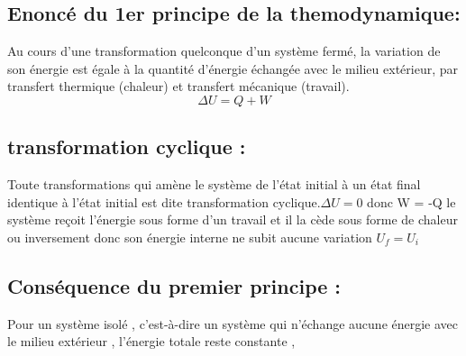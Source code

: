 \documentclass[12pt]{article}
\begin{document}
\subsection{Enoncé du 1er principe de la themodynamique:}
Au cours d'une transformation quelconque d'un système fermé, la variation de son énergie est égale à la quantité d'énergie échangée avec le milieu extérieur, par transfert thermique (chaleur) et transfert mécanique (travail).
$$\Delta{U}=Q + W $$

\subsection{transformation cyclique :}
Toute transformations qui amène le système de l’état initial à un état final identique à l’état initial est dite transformation
cyclique.$\Delta{U}= 0$
donc W = -Q le système reçoit l’énergie sous forme d’un travail et il la cède sous forme de chaleur ou inversement donc son énergie interne
ne subit aucune variation $U_f = U_i$
\subsection{Conséquence du premier principe :}
Pour un système isolé , c'est-à-dire un système qui n’échange aucune énergie avec le milieu extérieur , l’énergie totale
reste constante ,
\end{document}
